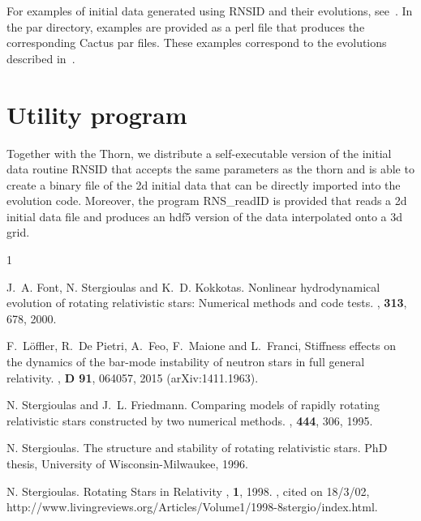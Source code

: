 \documentclass{article}
\begin{document}
For examples of initial data generated using RNSID and their
evolutions, see~\cite{rotns1,rotns2}. In the par directory, examples
are provided as a perl file that produces the corresponding Cactus par
files. These examples correspond to the evolutions described
in~\cite{rotns1,rotns2}.

\section{Utility program}

Together with the Thorn, we distribute a self-executable version of
the initial data routine RNSID that accepts the same parameters as the
thorn and is able to create a binary file of the 2d initial data that
can be directly imported into the evolution code. Moreover, the
program RNS\_readID is provided that reads a 2d initial data file and
produces an hdf5 version of the data interpolated onto a 3d grid.


\begin{thebibliography}{1}

J.~A. Font, N. Stergioulas and K.~D. Kokkotas.
\newblock Nonlinear hydrodynamical evolution of rotating relativistic
stars: Numerical methods and code tests.
, {\bf 313}, 678, 2000.

F.~L\"offler, R.~De Pietri, A.~Feo, F.~Maione and L.~Franci, 
\newblock Stiffness effects on the dynamics of the bar-mode instability 
of neutron stars in full general relativity. 
, {\bf D 91}, 064057, 2015 (arXiv:1411.1963).

N. Stergioulas and J.~L. Friedmann.
\newblock Comparing models of rapidly rotating relativistic stars
constructed by two numerical methods.
, {\bf 444}, 306, 1995.

N. Stergioulas.
\newblock The structure and stability of rotating relativistic stars.
\newblock PhD thesis, University of Wisconsin-Milwaukee, 1996.

N. Stergioulas.
\newblock Rotating Stars in Relativity
, {\bf 1}, 1998.
, cited on 18/3/02,
  http://www.livingreviews.org/Articles/Volume1/1998-8stergio/index.html.

\end{thebibliography}





\end{document}
